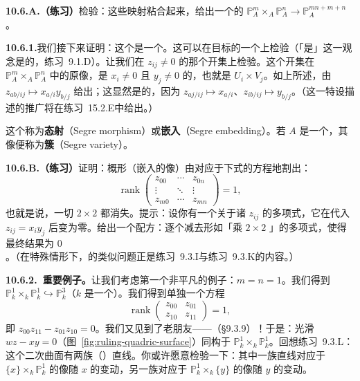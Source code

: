 \textbf{10.6.A.（练习）}\quad 检验：这些映射粘合起来，给出一个\trWellDefined{}的\trMorphism{} $\mathbb{P}^m_A\times_A\mathbb{P}^n_A\to\mathbb{P}^{mn+m+n}_A$。

\textbf{10.6.1.}\quad 我们接下来证明：这个\trMorphism{}是一个\trClosedEmbedding。这可以在目标的一个\trOpenCover{}上检验（「是\trClosedEmbedding」这一观念是\trAffineLocal{}的，\mbox{练习~9.1.D}）。让我们在 $z_{ij}\neq 0$ 的那个开集上检验。这个开集在 $\mathbb{P}^m_A\times_A\mathbb{P}^n_A$ 中的原像，是 $x_i\neq 0$ 且 $y_j\neq 0$ 的\trLocus，也就是 $U_i\times V_j$。如上所述，\trRingMorphism{}由 $z_{ab/ij}\mapsto x_{a/i}y_{b/j}$ 给出；这显然是\trSurjectiveMap{}的，因为 $z_{aj/ij}\mapsto x_{a/i}$、$z_{ib/ij}\mapsto y_{b/j}$。（这一特设描述的推广将在\mbox{练习~15.2.E}中给出。）

这个\trMap{}称为\textbf{\trSegre{}态射}（Segre morphism）或\textbf{\trSegre{}嵌入}（Segre embedding）。若 $A$ 是一个\trField，其像便称为\textbf{\trSegre{}簇}（Segre variety）。

\textbf{10.6.B.（练习）}\quad 证明：\trSegre{}概形（\trSegre{}嵌入的像）由对应于下式的方程\trSchemeTheoretic{}地割出：
\[
\operatorname{rank}\begin{pmatrix}
z_{00} & \cdots & z_{0n}\\
\vdots & \ddots & \vdots\\
z_{m0} & \cdots & z_{mn}
\end{pmatrix}=1,
\]
也就是说，一切 $2\times 2$ \trMinor{}都消失。提示：设你有一个关于诸 $z_{ij}$ 的多项式，它在代入 $z_{ij}=x_iy_j$ 后变为零。给出一个配方：逐个减去形如「\trMonomial{}乘 $2\times 2$ \trMinor」的多项式，使得最终结果为 $0$。（在特殊情形下，\trVeroneseEmbedding{}的类似问题正是\mbox{练习~9.3.I}与\mbox{练习~9.3.K}的内容。）

\textbf{10.6.2.\ 重要例子。}\quad 让我们考虑第一个非平凡的例子：$m=n=1$。我们得到 $\mathbb{P}^1_k\times_k\mathbb{P}^1_k\hookrightarrow\mathbb{P}^3_k$（$k$ 是一个\trField）。我们得到单独一个方程
\[
\operatorname{rank}\begin{pmatrix} z_{00} & z_{01}\\ z_{10} & z_{11}\end{pmatrix}=1,
\]
即 $z_{00}z_{11}-z_{01}z_{10}=0$。我们又见到了老朋友——\trQuadricSurface{}（\S9.3.9）！于是：光滑\trQuadricSurface{} $wz-xy=0$（图~\ref{fig:ruling-quadric-surface}）同构于 $\mathbb{P}^1_k\times_k\mathbb{P}^1_k$。回想\mbox{练习~9.3.L}：这个二次曲面有两族（\trRuling）直线。你或许愿意检验一下：其中一族直线对应于 $\{x\}\times_k\mathbb{P}^1_k$ 的像随 $x$ 的变动，另一族对应于 $\mathbb{P}^1_k\times_k\{y\}$ 的像随 $y$ 的变动。

